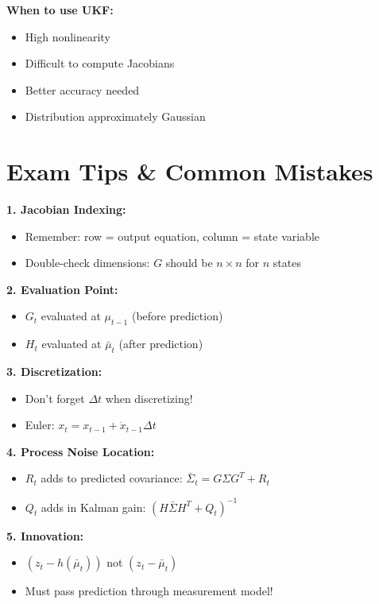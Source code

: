 \vspace{3mm}
\textbf{When to use UKF:}
\begin{itemize}
    \item High nonlinearity
    \item Difficult to compute Jacobians
    \item Better accuracy needed
    \item Distribution approximately Gaussian
\end{itemize}

\section{Exam Tips \& Common Mistakes}

\begin{tcolorbox}[colback=red!10!white,colframe=red!75!black,title=\textbf{Common Exam Mistakes}]

\textbf{1. Jacobian Indexing:}
\begin{itemize}
    \item Remember: row = output equation, column = state variable
    \item Double-check dimensions: $G$ should be $n \times n$ for $n$ states
\end{itemize}

\textbf{2. Evaluation Point:}
\begin{itemize}
    \item $G_t$ evaluated at $\mu_{t-1}$ (before prediction)
    \item $H_t$ evaluated at $\bar{\mu}_t$ (after prediction)
\end{itemize}

\textbf{3. Discretization:}
\begin{itemize}
    \item Don't forget $\Delta t$ when discretizing!
    \item Euler: $x_t = x_{t-1} + \dot{x}_{t-1} \Delta t$
\end{itemize}

\textbf{4. Process Noise Location:}
\begin{itemize}
    \item $R_t$ adds to predicted covariance: $\bar{\Sigma}_t = G\Sigma G^T + R_t$
    \item $Q_t$ adds in Kalman gain: $(H\bar{\Sigma}H^T + Q_t)^{-1}$
\end{itemize}

\textbf{5. Innovation:}
\begin{itemize}
    \item $(z_t - h(\bar{\mu}_t))$ not $(z_t - \bar{\mu}_t)$
    \item Must pass prediction through measurement model!
\end{itemize}

\end{tcolorbox}

